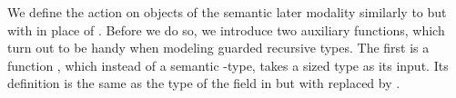 We define the action on objects of the semantic later modality similarly to  but with  in place of .
Before we do so, we introduce two auxiliary functions, which turn out to be handy when modeling guarded recursive types.
The first is a function , which instead of a semantic -type, takes a sized type as its input.
Its definition is the same as the type of the field  in  but with  replaced by .
\begin{code}%
\>[0]\AgdaSpace{}%
\AgdaSymbol{:}\AgdaSpace{}%
\AgdaSymbol{(}\AgdaSpace{}%
\AgdaSpace{}%
\AgdaSymbol{)}\AgdaSpace{}%
\AgdaSpace{}%
\AgdaSpace{}%
\AgdaSpace{}%
\<%
\\
\>[0]\AgdaSpace{}%
\AgdaSpace{}%
\AgdaSpace{}%
\AgdaSymbol{=}\AgdaSpace{}%
\AgdaSymbol{(}\AgdaSpace{}%
\AgdaSymbol{:}\AgdaSpace{}%
\AgdaSpace{}%
\AgdaSymbol{)}\AgdaSpace{}%
\AgdaSpace{}%
\AgdaSpace{}%
\AgdaSymbol{(}\AgdaSpace{}%
\AgdaSymbol{)}\<%
\end{code}

